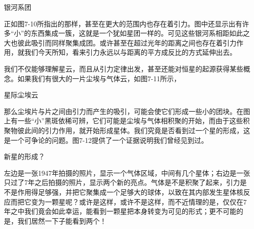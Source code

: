 \documentclass[12pt,oneside]{book}
\begin{document}
\begin{linefig}{银河系团}
\caption{银河系团}
\label{fig:银河系团}
\end{linefig}
正如图7-10所指出的那样，甚至在更大的范围内也存在着引力。图中还显示出有许多“小”的东西集成一簇，这就是一个犹如星团一样的。可见这些银河系相距如此之大也彼此吸引而同样聚集成团。或许甚至在超过光年的距离之间也存在着引力作用，就我们今天所知，看来引力永远以与距离的平方成反比的方式延伸出去。

我们不仅能够理解星云，而且从引力定律出发，甚至还能对恒星的起源获得某些概念。如果我们有很大的一片尘埃与气体云，如图7-11所示，
\begin{linefig}{星际尘埃云}
\caption{星际尘埃云}
\label{fig:星际尘埃云}
\end{linefig}
那么尘埃片与片之间由引力而产生的吸引，可能会使它们形成一些小的团块。在图上有一些“小”黑斑依稀可辨，它们可能是尘埃与气体相积聚的开始，而由于这些积聚物彼此间的引力作用，就开始形成星体。我们究竟是否看到过一个星的形成，这是一个可争论的问题。图7-12提供了一个证据说明我们曾经见到过。
\begin{linefig}{新星的形成？}
\caption{新星的形成？}
\label{fig:新星的形成？}
\end{linefig}
左边是一张1947年拍摄的照片，显示一个气体区域，中间有几个星体；右边是一张只过了7年之后拍摄的照片，显示两个新的亮点。气体是不是积聚了起来，引力是不是作用得足够强，并把它聚集成一个足够大的球体，以致在其内部发生星体核反应而把它变为一颗星呢？或许是这样，或许不是这样，而不近情理的是，仅仅在7年之中我们竟会如此幸运，能看到一颗星把本身转变为可见的形式；更不可能的是，我们居然一下子能看到两个！
\end{document}
